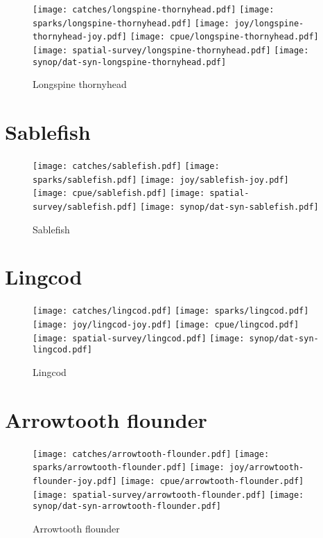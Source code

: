 \begin{figure}[htbp]
\centering
\texttt{[image: catches/longspine-thornyhead.pdf]}
\texttt{[image: sparks/longspine-thornyhead.pdf]}
\texttt{[image: joy/longspine-thornyhead-joy.pdf]}
\texttt{[image: cpue/longspine-thornyhead.pdf]}
\texttt{[image: spatial-survey/longspine-thornyhead.pdf]}
\texttt{[image: synop/dat-syn-longspine-thornyhead.pdf]}
\caption{Longspine thornyhead}
\end{figure}
\clearpage
\section*{Sablefish}

\begin{figure}[htbp]
\centering
\texttt{[image: catches/sablefish.pdf]}
\texttt{[image: sparks/sablefish.pdf]}
\texttt{[image: joy/sablefish-joy.pdf]}
\texttt{[image: cpue/sablefish.pdf]}
\texttt{[image: spatial-survey/sablefish.pdf]}
\texttt{[image: synop/dat-syn-sablefish.pdf]}
\caption{Sablefish}
\end{figure}
\clearpage
\section*{Lingcod}

\begin{figure}[htbp]
\centering
\texttt{[image: catches/lingcod.pdf]}
\texttt{[image: sparks/lingcod.pdf]}
\texttt{[image: joy/lingcod-joy.pdf]}
\texttt{[image: cpue/lingcod.pdf]}
\texttt{[image: spatial-survey/lingcod.pdf]}
\texttt{[image: synop/dat-syn-lingcod.pdf]}
\caption{Lingcod}
\end{figure}
\clearpage
\section*{Arrowtooth flounder}

\begin{figure}[htbp]
\centering
\texttt{[image: catches/arrowtooth-flounder.pdf]}
\texttt{[image: sparks/arrowtooth-flounder.pdf]}
\texttt{[image: joy/arrowtooth-flounder-joy.pdf]}
\texttt{[image: cpue/arrowtooth-flounder.pdf]}
\texttt{[image: spatial-survey/arrowtooth-flounder.pdf]}
\texttt{[image: synop/dat-syn-arrowtooth-flounder.pdf]}
\caption{Arrowtooth flounder}
\end{figure}
\clearpage
